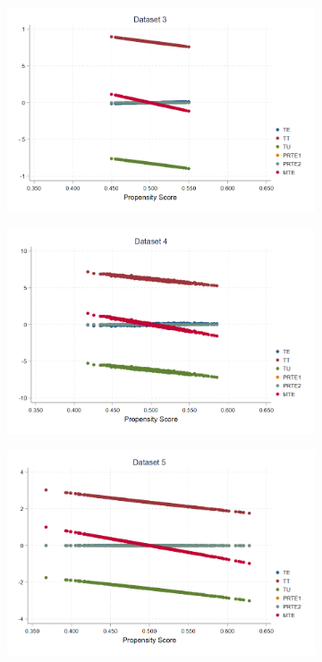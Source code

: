 \documentclass{article}
\begin{document}
\begin{solution}
\begin{figure}[H]
\begin{subfigure}[b]{0.43\textwidth}
    \end{subfigure}
    \begin{subfigure}[b]{0.43\textwidth}
        \centering
        \includegraphics[width=\textwidth]{ps2Heckman/figures/q8_partb_d3_all.png}
    \end{subfigure}
    \begin{subfigure}[b]{0.43\textwidth}
        \centering
        \includegraphics[width=\textwidth]{ps2Heckman/figures/q8_partb_d4_all.png}
    \end{subfigure}
    \begin{subfigure}[b]{0.43\textwidth}
        \centering
        \includegraphics[width=\textwidth]{ps2Heckman/figures/q8_partb_d5_all.png}

\end{subfigure}
\end{figure}
\end{solution}
\end{document}
